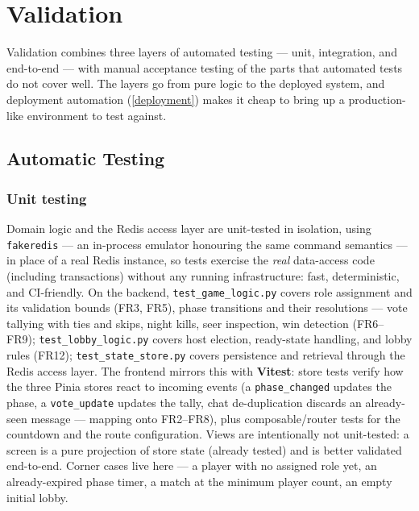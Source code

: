 \documentclass{scrartcl}
\begin{document}
\section{Validation}\label{validation}

Validation combines three layers of automated testing --- unit, integration, and
end-to-end --- with manual acceptance testing of the parts that automated tests do
not cover well. The layers go from pure logic to the deployed system, and
deployment automation (\cref{deployment}) makes it cheap to bring up a
production-like environment to test against.

\subsection{Automatic Testing}\label{automatic-testing}

\subsubsection{Unit testing}\label{unit-testing}

Domain logic and the Redis access layer are unit-tested in isolation, using
\texttt{fakeredis} --- an in-process emulator honouring the same command semantics
--- in place of a real Redis instance, so tests exercise the \emph{real}
data-access code (including transactions) without any running infrastructure:
fast, deterministic, and CI-friendly. On the backend,
\texttt{test\_game\_logic.py} covers role assignment and its validation bounds
(FR3, FR5), phase transitions and their resolutions --- vote tallying with ties
and skips, night kills, seer inspection, win detection (FR6--FR9);
\texttt{test\_lobby\_logic.py} covers host election, ready-state handling, and
lobby rules (FR12); \texttt{test\_state\_store.py} covers persistence and
retrieval through the Redis access layer. The frontend mirrors this with
\textbf{Vitest}: store tests verify how the three Pinia stores react to incoming
events (a \texttt{phase\_changed} updates the phase, a \texttt{vote\_update}
updates the tally, chat de-duplication discards an already-seen message ---
mapping onto FR2--FR8), plus composable/router tests for the countdown and the
route configuration. Views are intentionally not unit-tested: a screen is a pure
projection of store state (already tested) and is better validated end-to-end.
Corner cases live here --- a player with no assigned role yet, an already-expired
phase timer, a match at the minimum player count, an empty initial lobby.
\end{document}
